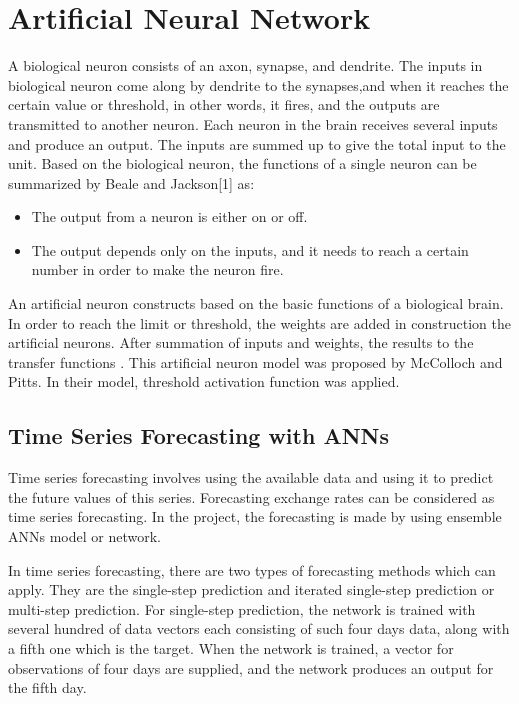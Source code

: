 \documentclass[journal]{IEEEtran}
\begin{document}
\section{Artificial Neural Network}

A biological neuron consists of an axon, synapse, and dendrite. The inputs in biological  neuron come along by dendrite to the synapses,and when it reaches  the certain value or threshold, in other words, it fires,  and the outputs are transmitted  to another neuron. Each neuron in the brain receives several inputs and produce  an output. The inputs  are summed up to give the total input to the unit. Based on the biological neuron, the functions of a single neuron can be summarized by Beale and Jackson[1] as:
\begin{itemize}
	\item The output from a neuron is either on or off.
	\item The output depends only on the inputs, and it  needs to reach a certain number in order to make the neuron fire.
\end{itemize}

An artificial neuron constructs based on the basic functions of  a biological brain. In order to reach the limit or threshold,  the weights are added in construction the artificial neurons. After summation of inputs and weights, the results  to the  transfer functions . This artificial neuron model was proposed by McColloch and Pitts. In their model, threshold activation function was applied.


\subsection{Time Series Forecasting with ANNs}

Time series forecasting involves using the available data and using it to predict the future values of this series. Forecasting exchange rates can be considered as time series forecasting. In the project,  the forecasting  is made by using ensemble ANNs model or network.

In time series forecasting, there are two types of forecasting methods which can apply. They are the single-step prediction and iterated single-step prediction or  multi-step prediction. For single-step prediction, the network is trained with several hundred of data vectors each consisting of such four days data, along with a fifth one which is the target. When the network is trained, a vector for observations of four days are supplied, and the network produces an output for the fifth day. 
\end{document}
